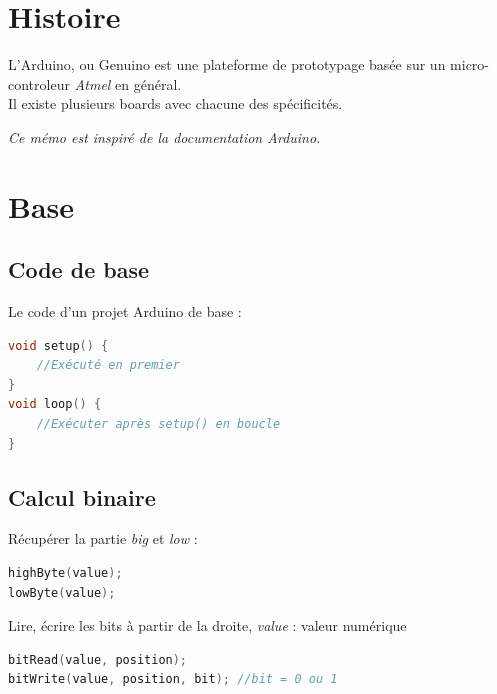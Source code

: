 


    \section{Histoire}
        \bmar
            L'Arduino, ou Genuino est une plateforme de prototypage basée sur un micro-controleur \textit{Atmel} en général.\\
            Il existe plusieurs boards avec chacune des spécificités.

            \emph{Ce mémo est inspiré de la documentation Arduino.}
        \emar
    \section{Base}
        \subsection{Code de base}
            \bmar
                Le code d'un projet Arduino de base :
            \emar

        \begin{lstlisting}[language=C]
void setup() {
    //Exécuté en premier
}
void loop() {
    //Exécuter après setup() en boucle
}
        \end{lstlisting}


        \subsection{Calcul binaire}
            \bmar
                Récupérer la partie \textit{big} et \textit{low} :
            \emar

            \begin{lstlisting}[language=C]
highByte(value);
lowByte(value);
            \end{lstlisting}

            \bmar
                Lire, écrire les bits à partir de la droite, \textit{value} : valeur numérique
            \emar

            \begin{lstlisting}[language=C]
bitRead(value, position);
bitWrite(value, position, bit); //bit = 0 ou 1
            \end{lstlisting}

